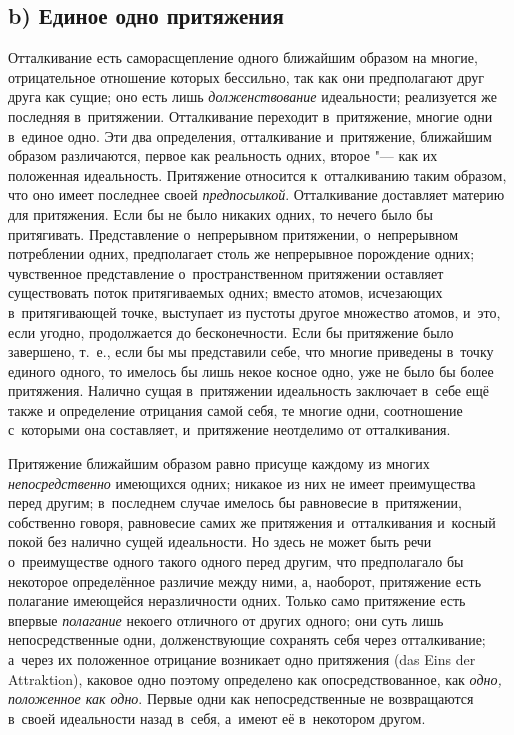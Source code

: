 \subsection[b) Единое одно притяжения]{b) Единое одно притяжения}

Отталкивание есть саморасщепление одного ближайшим образом на многие,
отрицательное отношение которых бессильно, так как они предполагают друг
друга как сущие; оно есть лишь {\em долженствование}
идеальности; реализуется же последняя в~притяжении. Отталкивание переходит
в~притяжение, многие одни в~единое одно. Эти два определения, отталкивание
и~притяжение, ближайшим образом различаются, первое как реальность одних,
второе "--- как их положенная идеальность. Притяжение относится к~отталкиванию
таким образом, что оно имеет последнее своей
{\em предпосылкой}. Отталкивание доставляет материю для
притяжения. Если бы не было никаких одних, то нечего было бы притягивать.
Представление о~непрерывном притяжении, о~непрерывном потреблении одних,
предполагает столь же непрерывное порождение одних; чувственное
представление о~пространственном притяжении оставляет существовать поток
притягиваемых одних; вместо атомов, исчезающих в~притягивающей точке,
выступает из пустоты другое множество атомов, и~это, если угодно,
продолжается до бесконечности. Если бы притяжение было завершено, т.~е.,
если бы мы представили себе, что многие приведены в~точку единого одного,
то имелось бы лишь некое косное одно, уже не было бы более притяжения.
Налично сущая в~притяжении идеальность заключает в~себе ещё также и
определение отрицания самой себя, те многие одни, соотношение с~которыми
она составляет, и~притяжение неотделимо от отталкивания.

Притяжение ближайшим образом равно присуще каждому из многих
{\em непосредственно} имеющихся одних; никакое из них
не имеет преимущества перед другим; в~последнем случае имелось бы
равновесие в~притяжении, собственно говоря, равновесие самих же притяжения
и~отталкивания и~косный покой без налично сущей идеальности. Но здесь не
может быть речи о~преимуществе одного такого одного перед другим, что
предполагало бы некоторое определённое различие между ними, а, наоборот,
притяжение есть полагание имеющейся неразличности одних. Только само
притяжение есть впервые {\em полагание} некоего
отличного от других одного; они суть лишь непосредственные одни,
долженствующие сохранять себя через отталкивание; а~через их положенное
отрицание возникает одно притяжения (das Eins der Attraktion), каковое одно
поэтому определено как опосредствованное, как
{\em одно, положенное как одно}. Первые одни как
непосредственные не возвращаются в~своей идеальности назад в~себя, а~имеют
её в~некотором другом.

